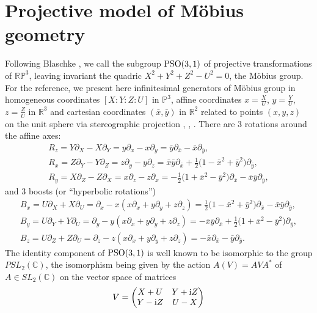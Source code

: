 \section{Projective model of M\"obius geometry}
Following Blaschke \cite{B-29}, we call the subgroup ${\rm PSO}(3,1)$ of projective transformations of $\mathbb{RP}^3$, leaving invariant the quadric
$
X^2+Y^2+Z^2-U^2=0$,
the M\"obius group.
For the reference, we present here infinitesimal generators of M\"obius group in homogeneous coordinates $[X:Y:Z:U]$ in $\mathbb{P}^3$, affine coordinates $x=\frac{X}{U}$, $y=\frac{Y}{U}$, $ z=\frac{Z}{U}$ in $\mathbb{R}^3$ and cartesian coordinates $(\bar{x},\bar{y})$ in $\mathbb{R}^2$ related to points $(x,y,z)$ on the unit sphere via stereographic projection
, , .
There are 3 rotations around the affine axes:
\begin{gather*}
R_z=Y\partial_X-X\partial_Y=y\partial_x-x\partial_y=\bar{y}\partial_{\bar{x}}-\bar{x}\partial_{\bar{y}},\\
R_x=Z\partial_Y-Y\partial_Z=z\partial_y-y\partial_z=\bar{x}\bar{y}\partial_{\bar{x}}+\frac{1}{2} \bigl(1-\bar{x}^2+\bar{y}^2\bigr)\partial_{\bar{y}},\\
R_y=X\partial_Z-Z\partial_X=x\partial_z-z\partial_x=-\frac{1}{2} \bigl(1+\bar{x}^2-\bar{y}^2\bigr)\partial_{\bar{x}}-\bar{x}\bar{y}\partial_{\bar{y}},
\end{gather*}
and 3 boosts (or ``hyperbolic rotations'')
\begin{gather*}
B_x=U\partial_X+X\partial_U=\partial_x-x(x\partial_x+y\partial_y+z\partial_z)=\frac{1}{2} \bigl(1-\bar{x}^2+\bar{y}^2\bigr)\partial_{\bar{x}}-\bar{x}\bar{y}\partial_{\bar{y}},\\
B_y=U\partial_Y+Y\partial_U=\partial_y-y(x\partial_x+y\partial_y+z\partial_z)= -\bar{x}\bar{y}\partial_{\bar{x}}+\frac{1}{2} \bigl(1+\bar{x}^2-\bar{y}^2\bigr)\partial_{\bar{y}},\\
B_z=U\partial_Z+Z\partial_U=\partial_z-z(x\partial_x+y\partial_y+z\partial_z)=-\bar{x}\partial_{\bar{x}}-\bar{y}\partial_{\bar{y}}.
\end{gather*}
The identity component of ${\rm PSO}(3,1)$ is well known to be isomorphic to the group $PSL_2(\mathbb{C})$, the isomorphism being given by the action $A(V)=AVA^*$ of $A\in SL_2(\mathbb{C})$ on the vector space of
matrices
\[
V=\left(
\begin{matrix}
X+U & Y+{\rm i}Z\\
Y-{\rm i}Z & U-X
\end{matrix}
\right)
\]
